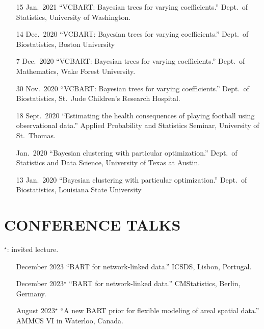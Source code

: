 \documentclass[margin]{res}
\begin{document}
\begin{resume}
\begin{itemize}
\item[15 Jan.~2021]{``VCBART: Bayesian trees for varying coefficients.'' Dept.~of Statistics, University of Washington.}

\item[14 Dec.~2020]{``VCBART: Bayesian trees for varying coefficients.'' Dept.~of Biostatistics, Boston University}

\item[7 Dec.~2020]{``VCBART: Bayesian trees for varying coefficients.'' Dept.~of Mathematics, Wake Forest University.}

\item[30 Nov.~2020]{``VCBART: Bayesian trees for varying coefficients.'' Dept.~of Biostatistics, St.~Jude Children's Research Hospital.}

\item[18 Sept.~2020]{``Estimating the health consequences of playing football using observational data.'' Applied Probability and Statistics Seminar, University of St.~Thomas.} 

\item[Jan.~2020]{``Bayesian clustering with particular optimization.'' Dept.~of Statistics and Data Science, University of Texas at Austin.}

\item[13 Jan.~2020]{``Bayesian clustering with particular optimization.'' Dept.~of Biostatistics, Louisiana State University}


\end{itemize}

\section{CONFERENCE TALKS}
\vspace{0.1in}
$^{\star}$: invited lecture.

\vspace{0.1in}
\begin{itemize}

\item[December 2023]{``BART for network-linked data.'' ICSDS, Lisbon, Portugal.}

\item[December 2023$^{\star}$]{``BART for network-linked data.'' CMStatistics, Berlin, Germany.}

\item[August 2023$^{\star}$]{``A new BART prior for flexible modeling of areal spatial data.'' AMMCS VI in Waterloo, Canada.}


\end{itemize}
\end{resume}
\end{document}
